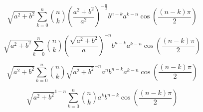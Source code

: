 \documentclass[a4paper]{article}
\begin{document}
	\[ \sqrt{a^{2} + b^{2}} \sum_{k=0}^{n} \binom{n}{k}
					       \left( \frac{a^{2} + b^{2}}{a^{2}} \right)^{-\frac{n}{2}}
					       b^{n-k} a^{k-n}
					       \cos \left( \frac{(n-k)\pi}{2} \right) \]

	\[ \sqrt{a^{2} + b^{2}} \sum_{k=0}^{n} \binom{n}{k}
					       \left( \frac{\sqrt{a^{2} + b^{2}}}{a} \right)^{-n}
					       b^{n-k} a^{k-n}
					       \cos \left( \frac{(n-k)\pi}{2} \right) \]

	\[ \sqrt{a^{2} + b^{2}} \sum_{k=0}^{n} \binom{n}{k}
					       \sqrt{a^{2} + b^{2}}^{-n}
					       a^{n}
					       b^{n-k} a^{k-n}
					       \cos \left( \frac{(n-k)\pi}{2} \right) \]

        \[ \sqrt{a^{2} + b^{2}}^{1-n} \sum_{k=0}^{n} \binom{n}{k}
						     a^{k} b^{n-k}
					             \cos \left( \frac{(n-k)\pi}{2} \right) \]
\end{document}
